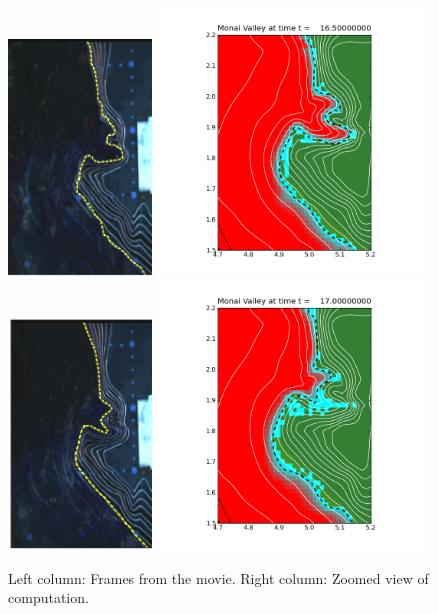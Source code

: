 \begin{figure}[ht]
\hfil\includegraphics[width=1.5in]{bp7/movie/Frame55.png}\hfil
\hfil\includegraphics[width=2.8in]{bp7/figs423/frame0011fig10.png}\hfil
\vskip 5pt
\hfil\includegraphics[width=1.5in]{bp7/movie/Frame70.png}\hfil
\hfil\includegraphics[width=2.8in]{bp7/figs423/frame0013fig10.png}\hfil
\vskip 5pt
\caption{\label{fig:bp7framesB} 
Left column: Frames from the movie.
Right column: Zoomed view of computation.
  }
\end{figure}

